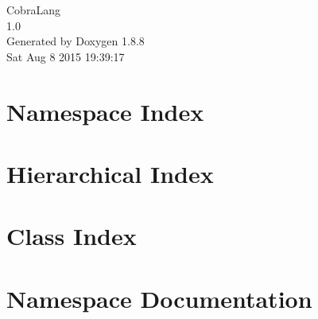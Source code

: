 \documentclass[twoside]{book}
\newcommand{\+}{\discretionary{\mbox{\scriptsize$\hookleftarrow$}}{}{}}
\newcommand{\clearemptydoublepage}{%
  \newpage{\pagestyle{empty}\cleardoublepage}%
}
\begin{document}
\hypersetup{pageanchor=false,
             bookmarks=true,
             bookmarksnumbered=true,
             pdfencoding=unicode
            }
\begin{titlepage}
\vspace*{7cm}
\begin{center}%
{\Large Cobra\+Lang \\[1ex]\large 1.\+0 }\\
\vspace*{1cm}
{\large Generated by Doxygen 1.8.8}\\
\vspace*{0.5cm}
{\small Sat Aug 8 2015 19:39:17}\\
\end{center}
\end{titlepage}
\clearemptydoublepage
\tableofcontents
\clearemptydoublepage
{}
\hypersetup{pageanchor=true}

\chapter{Namespace Index}

\chapter{Hierarchical Index}

\chapter{Class Index}

\chapter{Namespace Documentation}

\end{document}
